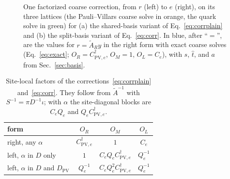 \documentclass[11pt,a4paper]{article}
\numberwithin{equation}{section}
\newcommand{\dg}{^{\dagger}}
\newcommand{\Dpv}{D_{\mathrm{PV}}}
\newcommand{\AR}{\tilde A_{R}}
\newcommand{\Pro}{\mathcal P}
\newcommand{\Pq}{\Pro_q}
\newcommand{\Pv}{\Pro_v}
\newcommand{\Dsym}{D_{\mathrm{sym}}}
\newcommand{\Ce}{C_{e}}
\newcommand{\Cpve}{C_{\mathrm{PV},e}}
\begin{document}
\begin{figure}[tbp]
\caption{One factorized coarse correction, from $r$ (left) to $e$ (right), on its three lattices
(the Pauli--Villars coarse solve in orange, the quark solve in green) for (a) the shared-basis
variant of Eq.~\eqref{eq:corrplain} and (b) the split-basis variant of Eq.~\eqref{eq:corr}. In blue,
after ``$=$'', are the values for $r=\AR y$ in the right form with exact coarse solves
(Eq.~\eqref{eq:exact}; $O_R=\Cpve\dg$, $O_M=1$, $O_L=\Ce$), with $s$, $\hat t$, and $a$ from
Sec.~\ref{sec:basis}.}
\label{fig:correction}
\end{figure}

\begin{table}[t]
\centering
\caption{Site-local factors of the corrections~\eqref{eq:corrplain} and~\eqref{eq:corr}. They
follow from $\tilde A^{-1}$ with $S^{-1}=\pi D^{-1}\iota$; with $\alpha$ the site-diagonal blocks
are $\Ce Q_e$ and $Q_e\Cpve\dg$.}
\label{tab:factors}
\renewcommand{\arraystretch}{1.25}
\begin{tabular}{@{}lccc@{}}
\toprule
form & $O_R$ & $O_M$ & $O_L$\\
\midrule
right, any $\alpha$ & $\Cpve\dg$ & $1$ & $\Ce$\\
left, $\alpha$ in $D$ only & $1$ & $\Ce Q_e\Cpve\dg$ & $Q_e^{-1}$\\
left, $\alpha$ in $D$ and $\Dpv$ & $Q_e^{-1}$ & $\Ce Q_e^2\Cpve\dg$ & $Q_e^{-1}$\\
\bottomrule
\end{tabular}
\end{table}
\end{document}
